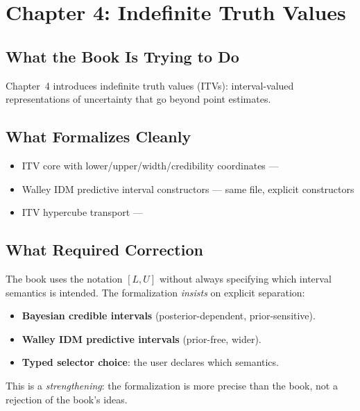 \documentclass[11pt,openany]{report}
\begin{document}
\chapter{Chapter 4: Indefinite Truth Values}
\label{ch:review-ch4}

\section{What the Book Is Trying to Do}

Chapter~4 introduces indefinite truth values (ITVs): interval-valued
representations of uncertainty that go beyond point estimates.

\section{What Formalizes Cleanly}

\begin{itemize}
\item ITV core with lower/upper/width/credibility coordinates ---
\item Walley IDM predictive interval constructors ---
  same file, explicit  constructors
\item ITV hypercube transport ---
\end{itemize}

\section{What Required Correction}

The book uses the notation $[L, U]$ without always specifying which
interval semantics is intended.  The formalization \emph{insists} on
explicit separation:

\begin{itemize}
\item \textbf{Bayesian credible intervals} (posterior-dependent, prior-sensitive).
\item \textbf{Walley IDM predictive intervals} (prior-free, wider).
\item \textbf{Typed selector choice}: the user declares which semantics.
\end{itemize}

This is a \emph{strengthening}: the formalization is more precise than
the book, not a rejection of the book's ideas.
\end{document}
